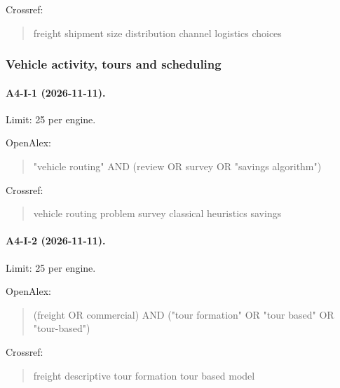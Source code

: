 \noindent Crossref:

\begin{quote}\footnotesize\ttfamily\raggedright

freight shipment size distribution channel logistics choices

\end{quote}

\subsubsection{Vehicle activity, tours and scheduling}

\paragraph{A4-I-1 (2026-11-11).} Limit: 25 per engine.

\noindent OpenAlex:

\begin{quote}\footnotesize\ttfamily\raggedright

"vehicle routing" AND (review OR survey OR "savings algorithm")

\end{quote}

\noindent Crossref:

\begin{quote}\footnotesize\ttfamily\raggedright

vehicle routing problem survey classical heuristics savings

\end{quote}

\paragraph{A4-I-2 (2026-11-11).} Limit: 25 per engine.

\noindent OpenAlex:

\begin{quote}\footnotesize\ttfamily\raggedright

(freight OR commercial) AND ("tour formation" OR "tour based" OR "tour-based")

\end{quote}

\noindent Crossref:

\begin{quote}\footnotesize\ttfamily\raggedright

freight descriptive tour formation tour based model

\end{quote}

